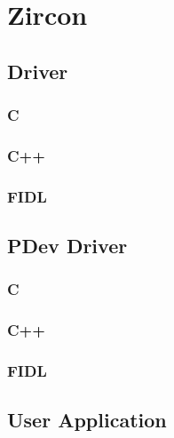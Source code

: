 
\section{Zircon}\label{sec:cs-zircon}


\subsection{Driver}
\subsubsection{C}
\subsubsection{C++}
\subsubsection{FIDL}

\subsection{PDev Driver}
\subsubsection{C}
\subsubsection{C++}
\subsubsection{FIDL}

\subsection{User Application}

